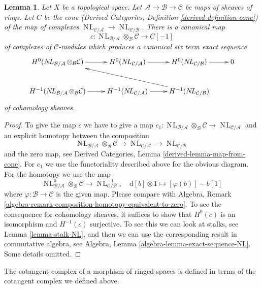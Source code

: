 \documentclass{stacks-project}
\theoremstyle{plain}
\newtheorem{lemma}[subsection]{Lemma}
\theoremstyle{definition}
\theoremstyle{remark}
\numberwithin{equation}{subsection}
\def\NL{\mathop{N\!L}\nolimits}
\begin{document}
\begin{lemma}
\label{lemma-exact-sequence-NL}
Let $X$ be a topological space. Let
$\mathcal{A} \to \mathcal{B} \to \mathcal{C}$
be maps of sheaves of rings. Let $C$ be the cone
(Derived Categories, Definition \ref{derived-definition-cone})
of the map of complexes
$\NL_{\mathcal{C}/\mathcal{A}} \to \NL_{\mathcal{C}/\mathcal{B}}$.
There is a canonical map
$$
c :
\NL_{\mathcal{B}/\mathcal{A}} \otimes_\mathcal{B} \mathcal{C}
\longrightarrow
C[-1]
$$
of complexes of $\mathcal{C}$-modules
which produces a canonical six term exact sequence
$$
\xymatrix{
H^0(\NL_{\mathcal{B}/\mathcal{A}} \otimes_\mathcal{B} \mathcal{C}) \ar[r] &
H^0(\NL_{\mathcal{C}/\mathcal{A}}) \ar[r] &
H^0(\NL_{\mathcal{C}/\mathcal{B}}) \ar[r] &
0 \\
H^{-1}(\NL_{\mathcal{B}/\mathcal{A}} \otimes_\mathcal{B} \mathcal{C}) \ar[r] &
H^{-1}(\NL_{\mathcal{C}/\mathcal{A}}) \ar[r] &
H^{-1}(\NL_{\mathcal{C}/\mathcal{B}}) \ar[llu]
}
$$
of cohomology sheaves.
\end{lemma}

\begin{proof}
To give the map $c$ we have to give a map
$c_1 : \NL_{\mathcal{B}/\mathcal{A}} \otimes_\mathcal{B} \mathcal{C}
\to \NL_{\mathcal{C}/\mathcal{A}}$ and an explicit homotopy
between the composition
$$
\NL_{\mathcal{B}/\mathcal{A}} \otimes_\mathcal{B} \mathcal{C} \to
\NL_{\mathcal{C}/\mathcal{A}} \to \NL_{\mathcal{C}/\mathcal{B}}
$$
and the zero map, see
Derived Categories, Lemma \ref{derived-lemma-map-from-cone}.
For $c_1$ we use the functoriality described
above for the obvious diagram. For the homotopy we use the map
$$
\NL_{\mathcal{B}/\mathcal{A}}^0 \otimes_\mathcal{B} \mathcal{C}
\longrightarrow
\NL_{\mathcal{C}/\mathcal{B}}^{-1},\quad
\text{d}[b] \otimes 1 \longmapsto [\varphi(b)] - b[1]
$$
where $\varphi : \mathcal{B} \to \mathcal{C}$ is the given map.
Please compare with
Algebra, Remark \ref{algebra-remark-composition-homotopy-equivalent-to-zero}.
To see the consequence for cohomology sheaves, it suffices to show
that $H^0(c)$ is an isomorphism and $H^{-1}(c)$ surjective.
To see this we can look at stalks, see Lemma \ref{lemma-stalk-NL},
and then we can use the corresponding result in commutative algebra,
see Algebra, Lemma \ref{algebra-lemma-exact-sequence-NL}.
Some details omitted.
\end{proof}

\noindent
The cotangent complex of a morphism of ringed spaces is defined
in terms of the cotangent complex we defined above.
\end{document}
